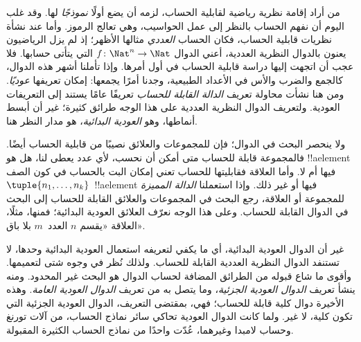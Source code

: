 \documentclass[../../../include/open-logic-section]{subfiles}
\begin{document}

من أراد إقامة نظرية رياضية لقابلية الحساب، لزمه أن يضع أولًا \emph{نموذجًا}
لها. وقد غلب اليوم أن نفهم الحساب بالنظر إلى عمل
الحواسيب، وهي تعالج الرموز. وأما عند نشأة نظريات قابلية الحساب، فكان
الحساب \emph{العددي} مثالها الأظهر؛ إذ لم يزل
الرياضيون يعنون بالدوال النظرية العددية، أعني الدوال
$f\colon \Nat^n \to \Nat$ التي يتأتى حسابها. فلا عجب أن اتجهت
إليها دراسة قابلية الحساب في أول أمرها. وإذا تأملنا أشهر
هذه الدوال، كالجمع والضرب والأس في الأعداد الطبيعية،
وجدنا أمرًا يجمعها: إمكان تعريفها \emph{عوديًا}. ومن هنا نشأت محاولة
تعريف \emph{الدالة القابلة للحساب} تعريفًا عامًا يستند إلى التعريفات العودية.
ولتعريف الدوال النظرية العددية على هذا الوجه طرائق كثيرة؛ غير أن
أبسط أنماطها، وهو \emph{العودية البدائية}، هو مدار النظر هنا.

ولا ينحصر البحث في الدوال؛ فإن للمجموعات والعلائق نصيبًا من قابلية
الحساب أيضًا. فالمجموعة قابلة للحساب متى أمكن أن نحسب، لأي عدد يعطى لنا، هل
هو !!a{element} فيها أم لا. وأما العلاقة فقابليتها للحساب
تعني إمكان البت بالحساب في كون الصف
$\tuple{n_1,\dots,n_k}$~!!a{element} فيها أو غير ذلك. وإذا استعملنا
\emph{الدالة المميزة} للمجموعة أو العلاقة، رجع البحث في المجموعات
والعلائق القابلة للحساب إلى البحث في الدوال القابلة للحساب. وعلى هذا الوجه
نعرّف العلائق العودية البدائية؛ فمنها، مثلًا، العلاقة «يقسم $n$ العدد~$m$
بلا باق».

غير أن الدوال العودية البدائية، أي ما يكفي لتعريفه استعمال العودية
البدائية وحدها، لا تستنفد الدوال النظرية العددية القابلة للحساب. ولذلك
نُظر في وجوه شتى لتعميمها. وأقوى ما شاع قبوله من الطرائق المضافة
لحساب الدوال هو البحث غير المحدود. ومنه ينشأ تعريف
\emph{الدوال العودية الجزئية}، وما يتصل به من تعريف \emph{الدوال
العودية العامة}. وهذه الأخيرة دوال كلية قابلة للحساب؛ فهي، بمقتضى التعريف،
الدوال العودية الجزئية التي تكون كلية، لا غير. ولما كانت الدوال
العودية تحاكي سائر نماذج الحساب، من آلات تورنغ وحساب لامبدا وغيرهما،
عُدّت واحدًا من نماذج الحساب الكثيرة المقبولة.
\end{document}
